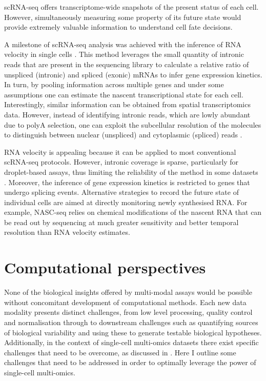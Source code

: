 scRNA-seq offers transcriptome-wide snapshots of the present status of each cell. However, simultaneously measuring some property of its future state would provide extremely valuable information to understand cell fate decisions. 

A milestone of scRNA-seq analysis was achieved with the inference of RNA velocity in single cells \cite{LaManno2018}. This method leverages the small quantity of intronic reads that are present in the sequencing library to calculate a relative ratio of unspliced (intronic) and spliced (exonic) mRNAs to infer gene expression kinetics. In turn, by pooling information across multiple genes and under some assumptions one can estimate the nascent transcriptional state for each cell. Interestingly, similar information can be obtained from spatial transcriptomics data. However, instead of identifying intronic reads, which are lowly abundant due to polyA selection, one can exploit the subcellular resolution of the molecules to distinguish between nuclear (unspliced) and cytoplasmic (spliced) reads \cite{Xia2019}.

RNA velocity is appealing because it can be applied to most conventional scRNA-seq protocols. However, intronic coverage is sparse, particularly for droplet-based assays, thus limiting the reliability of the method in some datasets \cite{Soneson2020}. Moreover, the inference of gene expression kinetics is restricted to genes that undergo splicing events. Alternative strategies to record the future state of individual cells are aimed at directly monitoring newly synthesised RNA. For example, NASC-seq \cite{Hendriks2019} relies on chemical modifications of the nascent RNA that can be read out by sequencing at much greater sensitivity and better temporal resolution than RNA velocity estimates.



\section{Computational perspectives} 

None of the biological insights offered by multi-modal assays would be possible without concomitant development of computational methods. Each new data modality presents distinct challenges, from low level processing, quality control and normalisation through to downstream challenges such as quantifying sources of biological variability and using these to generate testable biological hypotheses. Additionally, in the context of single-cell multi-omics datasets there exist specific challenges that need to be overcome, as discussed in . Here I outline some challenges that need to be addressed in order to optimally leverage the power of single-cell multi-omics.

